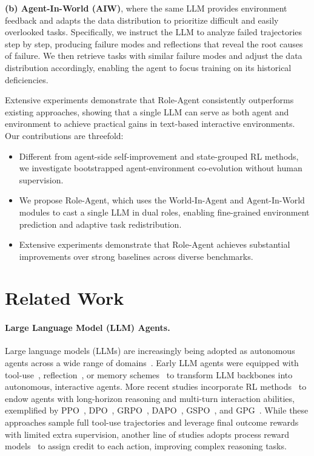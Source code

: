 \documentclass{llmxive}
\begin{document}
\textbf{(b) Agent-In-World (AIW)}, where the same LLM provides environment feedback and adapts the data distribution to prioritize difficult and easily overlooked tasks. Specifically, we instruct the LLM to analyze failed trajectories step by step, producing failure modes and reflections that reveal the root causes of failure. We then retrieve tasks with similar failure modes and adjust the data distribution accordingly, enabling the agent to focus training on its historical deficiencies.


Extensive experiments demonstrate that Role-Agent consistently outperforms existing approaches, showing that a single LLM can serve as both agent and environment to achieve practical gains in text-based interactive environments. Our contributions are threefold:

\begin{itemize}
    \item Different from agent-side self-improvement and state-grouped RL methods, we investigate bootstrapped agent-environment co-evolution without human supervision.
    \vspace{-0.1cm}
    \item We propose Role-Agent, which uses the World-In-Agent and Agent-In-World modules to cast a single LLM in dual roles, enabling fine-grained environment prediction and adaptive task redistribution.
    \vspace{-0.1cm} 
    \item Extensive experiments demonstrate that Role-Agent achieves substantial improvements over strong baselines across diverse benchmarks.
\end{itemize}


\section{Related Work}
\paragraph{Large Language Model (LLM) Agents.} Large language models (LLMs) are increasingly being adopted as autonomous agents across a wide range of domains~\cite{wang2023voyager,wang2024mobile,jiang2025aide,ou2025automind}. Early LLM agents were equipped with tool-use~\cite{yao2022react}, reflection~\cite{shinn2023reflexion}, or memory schemes~\cite{xu2025mem,fang2025memp,zhang2026memskill} to transform LLM backbones into autonomous, interactive agents. More recent studies incorporate RL methods~\cite{lambert2024tulu} to endow agents with long-horizon reasoning and multi-turn interaction abilities, exemplified by PPO~\cite{schulman2017proximal}, DPO~\cite{rafailov2023direct}, GRPO~\cite{guo2025deepseek}, DAPO~\cite{yu2025dapo}, GSPO~\cite{zheng2025group}, and GPG~\cite{chu2025gpg}. While these approaches sample full tool-use trajectories and leverage final outcome rewards with limited extra supervision, another line of studies adopts process reward models~\cite{shao2024deepseekmath,zhang2025process,wang2025stepsearch} to assign credit to each action, improving complex reasoning tasks.
\end{document}
